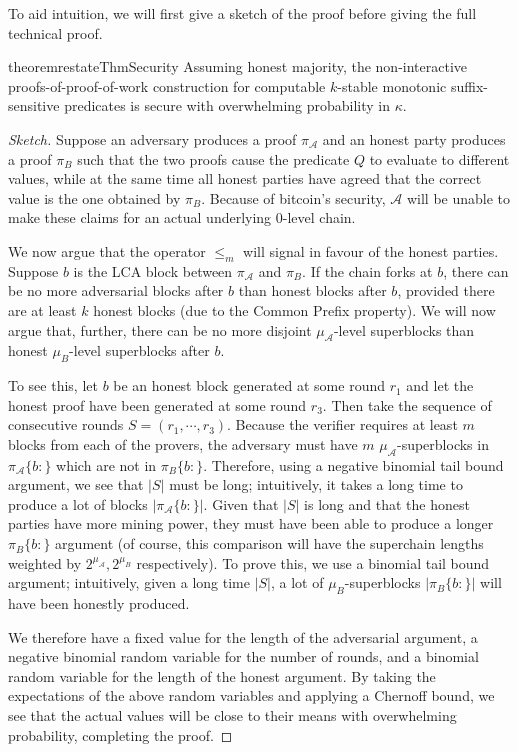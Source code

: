 To aid intuition, we will first give a sketch of the proof before giving the
full technical proof.

\begin{restatable}[Security]{theorem}{restateThmSecurity}
    \label{thm.security}
    Assuming honest majority, the non-interactive proofs-of-proof-of-work
    construction for computable $k$-stable monotonic suffix-sensitive predicates
    is secure with overwhelming probability in $\kappa$.
\end{restatable}
\begin{proof}[Sketch]
Suppose an adversary produces a proof $\pi_\mathcal{A}$ and an honest
party produces a proof $\pi_B$ such that the two proofs cause the predicate $Q$
to evaluate to different values, while at the same time all honest parties have
agreed that the correct value is the one obtained by $\pi_B$. Because of
bitcoin's security, $\mathcal{A}$ will be unable to make these claims for an
actual underlying 0-level chain.

We now argue that the operator $\leq_m$ will
signal in favour of the honest parties.
Suppose $b$ is the LCA block between $\pi_\mathcal{A}$ and $\pi_B$. If the chain
forks at $b$, there can be no more adversarial blocks after $b$ than honest
blocks after $b$, provided there are at least $k$ honest blocks (due to the
Common Prefix property). We will now argue that, further, there can be no more
disjoint $\mu_\mathcal{A}$-level superblocks than honest $\mu_B$-level
superblocks after $b$.

To see this, let $b$ be an honest block generated at some round $r_1$ and let
the honest proof have been generated at some round $r_3$. Then take the sequence
of consecutive rounds $S = (r_1, \cdots, r_3)$. Because the verifier requires at
least $m$ blocks from each of the provers, the adversary must have $m$
$\mu_\mathcal{A}$-superblocks in $\pi_\mathcal{A}\{b:\}$ which are not in
$\pi_B\{b:\}$. Therefore, using a negative binomial tail bound argument, we see
that $|S|$ must be long; intuitively, it takes a long time to produce a lot of
blocks $|\pi_\mathcal{A}\{b:\}|$. Given that $|S|$ is long and that the honest
parties have more mining power, they must have been able to produce a longer
$\pi_B\{b:\}$ argument (of course, this comparison will have the superchain
lengths weighted by $2^{\mu_\mathcal{A}}, 2^{\mu_B}$ respectively). To prove
this, we use a binomial tail bound argument; intuitively, given a long time
$|S|$, a lot of $\mu_B$-superblocks $|\pi_B\{b:\}|$ will have been honestly
produced.

We therefore have a fixed value for the length of the adversarial argument, a
negative binomial random variable for the number of rounds, and a binomial
random variable for the length of the honest argument. By taking the
expectations of the above random variables and applying a Chernoff bound, we see
that the actual values will be close to their means with overwhelming
probability, completing the proof.
\Qed
\end{proof}

